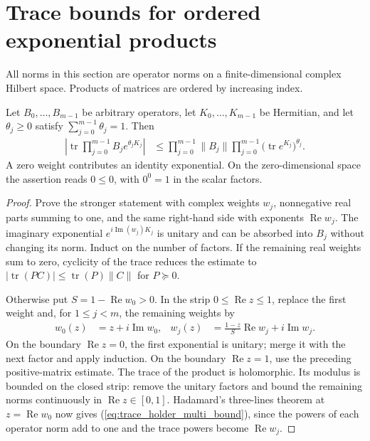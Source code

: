 \section{Trace bounds for ordered exponential products}

All norms in this section are operator norms on a finite-dimensional complex
Hilbert space. Products of matrices are ordered by increasing index.

\begin{theorem}
    \label{thm:trace_holder_multi}
    \leanok
    Let $B_0,\ldots,B_{m-1}$ be arbitrary operators, let
    $K_0,\ldots,K_{m-1}$ be Hermitian, and let $\theta_j\ge0$ satisfy
    $\sum_{j=0}^{m-1}\theta_j=1$. Then
    \begin{align}
        \left|\operatorname{tr}\prod_{j=0}^{m-1} B_j e^{\theta_jK_j}\right|
         & \le \prod_{j=0}^{m-1}\|B_j\|
        \prod_{j=0}^{m-1}\bigl(\operatorname{tr}e^{K_j}\bigr)^{\theta_j}.
        \label{eq:trace_holder_multi_bound}
    \end{align}
    A zero weight contributes an identity exponential. On the zero-dimensional
    space the assertion reads $0\le0$, with $0^0=1$ in the scalar factors.
\end{theorem}
\begin{proof}\leanok
    Prove the stronger statement with complex weights $w_j$, nonnegative real
    parts summing to one, and the same right-hand side with exponents
    $\operatorname{Re}w_j$. The imaginary exponential $e^{i\operatorname{Im}(w_j)K_j}$
    is unitary and can be absorbed into $B_j$ without changing its norm.
    Induct on the number of factors. If the remaining real weights sum to
    zero, cyclicity of the trace reduces the estimate to
    $|\operatorname{tr}(PC)|\le\operatorname{tr}(P)\|C\|$ for $P\succeq0$.

    Otherwise put $S=1-\operatorname{Re}w_0>0$. In the strip
    $0\le\operatorname{Re}z\le1$, replace the first weight and, for $1\le j<m$, the remaining weights by
    \begin{align}
        w_0(z) & =z+i\operatorname{Im}w_0,
               & w_j(z)                    & =\frac{1-z}{S}\operatorname{Re}w_j+i\operatorname{Im}w_j
        .
        \label{eq:trace_holder_multi_interpolation}
    \end{align}
    On the boundary $\operatorname{Re}z=0$, the first exponential is unitary;
    merge it with the next factor and apply induction. On the boundary
    $\operatorname{Re}z=1$, use the preceding positive-matrix estimate.
    The trace of the product is holomorphic. Its modulus is bounded on the
    closed strip: remove the unitary factors and bound the remaining norms
    continuously in $\operatorname{Re}z\in[0,1]$.
    Hadamard's three-lines theorem at $z=\operatorname{Re}w_0$ now gives
    (\ref{eq:trace_holder_multi_bound}), since the powers of each operator
    norm add to one and the trace powers become $\operatorname{Re}w_j$.
\end{proof}

